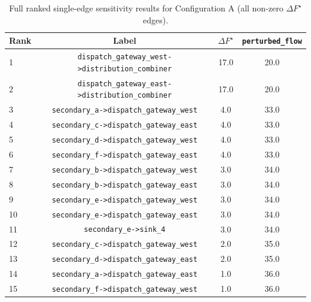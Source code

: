 \documentclass[12pt]{report}
\begin{document}
\begin{table}[htbp]
\centering
\caption{Full ranked single-edge sensitivity results for Configuration A (all non-zero $\Delta F^\star$ edges).}
\label{tab:critical_edges_config_a}
\begin{tabular}{lccc}
\toprule
Rank & Label & $\Delta F^\star$ & \texttt{perturbed\_flow} \\
\midrule
1 & \texttt{dispatch\_gateway\_west->distribution\_combiner} & 17.0 & 20.0 \\
2 & \texttt{dispatch\_gateway\_east->distribution\_combiner} & 17.0 & 20.0 \\
3 & \texttt{secondary\_a->dispatch\_gateway\_west} & 4.0 & 33.0 \\
4 & \texttt{secondary\_c->dispatch\_gateway\_east} & 4.0 & 33.0 \\
5 & \texttt{secondary\_d->dispatch\_gateway\_west} & 4.0 & 33.0 \\
6 & \texttt{secondary\_f->dispatch\_gateway\_east} & 4.0 & 33.0 \\
7 & \texttt{secondary\_b->dispatch\_gateway\_west} & 3.0 & 34.0 \\
8 & \texttt{secondary\_b->dispatch\_gateway\_east} & 3.0 & 34.0 \\
9 & \texttt{secondary\_e->dispatch\_gateway\_west} & 3.0 & 34.0 \\
10 & \texttt{secondary\_e->dispatch\_gateway\_east} & 3.0 & 34.0 \\
11 & \texttt{secondary\_e->sink\_4} & 3.0 & 34.0 \\
12 & \texttt{secondary\_c->dispatch\_gateway\_west} & 2.0 & 35.0 \\
13 & \texttt{secondary\_d->dispatch\_gateway\_east} & 2.0 & 35.0 \\
14 & \texttt{secondary\_a->dispatch\_gateway\_east} & 1.0 & 36.0 \\
15 & \texttt{secondary\_f->dispatch\_gateway\_west} & 1.0 & 36.0 \\
\bottomrule
\end{tabular}
\end{table}
\end{document}
